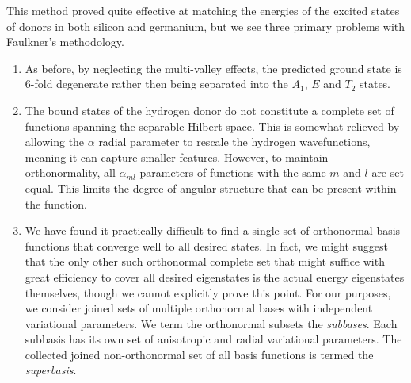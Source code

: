 This method proved quite effective at matching the energies of the excited
states of donors in both silicon and germanium, but we see three primary
problems with Faulkner's methodology.
\begin{enumerate}
    \item As before, by neglecting the multi-valley effects, the predicted
    ground state is 6-fold degenerate rather then being separated into the
    $A_{1}$, $E$ and $T_{2}$ states.
    \item The bound states of the hydrogen donor do not constitute a complete
    set of functions spanning the separable Hilbert space. This is somewhat
    relieved by allowing the $\alpha$ radial parameter to rescale the hydrogen
    wavefunctions, meaning it can capture smaller features. However, to maintain
    orthonormality, all $\alpha_{ml}$ parameters of functions with the same $m$
    and $l$ are set equal. This limits the degree of angular structure that can
    be present within the function.
    \item We have found it practically difficult to find a single set of
    orthonormal basis functions that converge well to all desired states. In
    fact, we might suggest that the only other such orthonormal complete set
    that might suffice with great efficiency to cover all desired eigenstates is
    the actual energy eigenstates themselves, though we cannot explicitly prove
    this point. For our purposes, we consider joined sets of multiple
    orthonormal bases with independent variational parameters. We term the
    orthonormal subsets the \emph{subbases}. Each subbasis has its own set of
    anisotropic and radial variational parameters. The collected joined
    non-orthonormal set of all basis functions is termed the \emph{superbasis}.
\end{enumerate}

